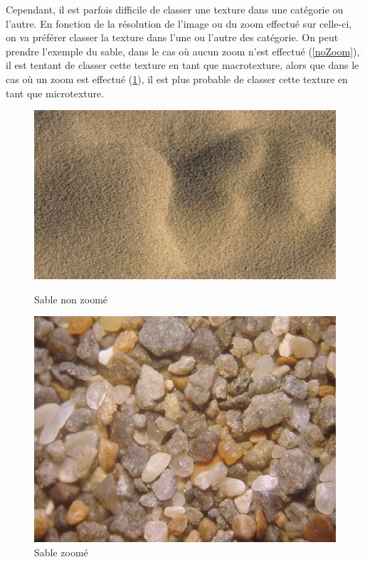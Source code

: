Cependant, il est parfois difficile de classer une texture dans une catégorie ou l'autre. En fonction de la résolution de l'image ou du zoom effectué sur celle-ci, on va préférer classer la texture dans l'une ou l'autre des catégorie. On peut prendre l'exemple du sable, dans le cas où aucun zoom n'est effectué (\ref{noZoom}), il est tentant de classer cette texture en tant que macrotexture, alors que dans le cas où un zoom est effectué (\ref{Zoom}), il est plus probable de classer cette texture en tant que microtexture.

\begin{figure}
   \begin{minipage}[c]{.46\linewidth}
	  \centering
      \includegraphics[scale=0.16]{images/sableNoZoom.jpg}
      \caption{\label{noZoom} Sable non zoomé}
   \end{minipage} \hfill
   \begin{minipage}[c]{.46\linewidth}
      \centering
      \includegraphics[scale=0.2]{images/sableZoom.jpg}
      \caption{\label{Zoom} Sable zoomé}
   \end{minipage}
\end{figure}

